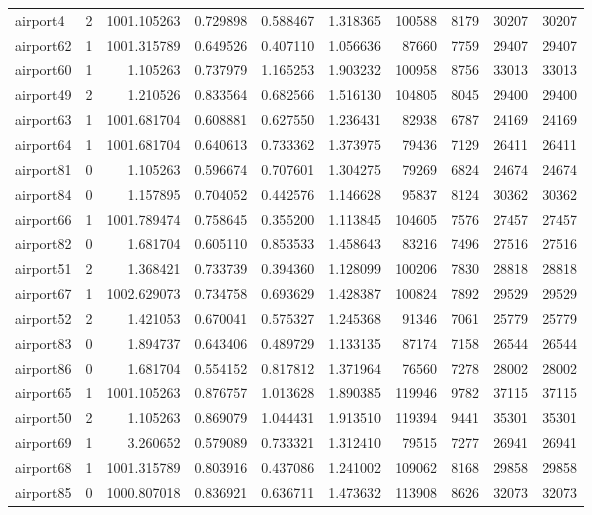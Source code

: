 \documentclass[../../../thesis.tex]{subfiles}
\begin{document}
\begin{longtable}{|l|r|r|r|r|r|r|r|r|r|}
airport4 & 2 & 1001.105263 & 0.729898 & 0.588467 & 1.318365 & 100588 & 8179 & 30207 & 30207 \\
airport62 & 1 & 1001.315789 & 0.649526 & 0.407110 & 1.056636 & 87660 & 7759 & 29407 & 29407 \\
airport60 & 1 & 1.105263 & 0.737979 & 1.165253 & 1.903232 & 100958 & 8756 & 33013 & 33013 \\
airport49 & 2 & 1.210526 & 0.833564 & 0.682566 & 1.516130 & 104805 & 8045 & 29400 & 29400 \\
airport63 & 1 & 1001.681704 & 0.608881 & 0.627550 & 1.236431 & 82938 & 6787 & 24169 & 24169 \\
airport64 & 1 & 1001.681704 & 0.640613 & 0.733362 & 1.373975 & 79436 & 7129 & 26411 & 26411 \\
airport81 & 0 & 1.105263 & 0.596674 & 0.707601 & 1.304275 & 79269 & 6824 & 24674 & 24674 \\
airport84 & 0 & 1.157895 & 0.704052 & 0.442576 & 1.146628 & 95837 & 8124 & 30362 & 30362 \\
airport66 & 1 & 1001.789474 & 0.758645 & 0.355200 & 1.113845 & 104605 & 7576 & 27457 & 27457 \\
airport82 & 0 & 1.681704 & 0.605110 & 0.853533 & 1.458643 & 83216 & 7496 & 27516 & 27516 \\
airport51 & 2 & 1.368421 & 0.733739 & 0.394360 & 1.128099 & 100206 & 7830 & 28818 & 28818 \\
airport67 & 1 & 1002.629073 & 0.734758 & 0.693629 & 1.428387 & 100824 & 7892 & 29529 & 29529 \\
airport52 & 2 & 1.421053 & 0.670041 & 0.575327 & 1.245368 & 91346 & 7061 & 25779 & 25779 \\
airport83 & 0 & 1.894737 & 0.643406 & 0.489729 & 1.133135 & 87174 & 7158 & 26544 & 26544 \\
airport86 & 0 & 1.681704 & 0.554152 & 0.817812 & 1.371964 & 76560 & 7278 & 28002 & 28002 \\
airport65 & 1 & 1001.105263 & 0.876757 & 1.013628 & 1.890385 & 119946 & 9782 & 37115 & 37115 \\
airport50 & 2 & 1.105263 & 0.869079 & 1.044431 & 1.913510 & 119394 & 9441 & 35301 & 35301 \\
airport69 & 1 & 3.260652 & 0.579089 & 0.733321 & 1.312410 & 79515 & 7277 & 26941 & 26941 \\
airport68 & 1 & 1001.315789 & 0.803916 & 0.437086 & 1.241002 & 109062 & 8168 & 29858 & 29858 \\
airport85 & 0 & 1000.807018 & 0.836921 & 0.636711 & 1.473632 & 113908 & 8626 & 32073 & 32073 \\

\end{longtable}
\end{document}
